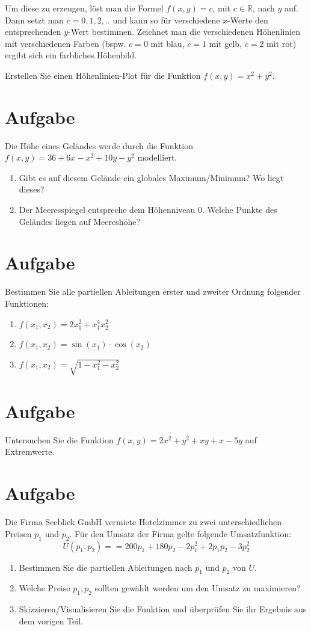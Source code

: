 \documentclass[fontsize=11pt, parskip=half]{scrartcl}
\newcommand{\R}{\mathbb{R}}
\begin{document}
Um diese zu erzeugen, löst man die Formel $f(x,y) = c$, mit $c \in \R$, nach $y$ auf. Dann setzt man $c = 0,1,2,..$ und kann so für verschiedene $x$-Werte den entsprechenden $y$-Wert bestimmen. Zeichnet man die verschiedenen Höhenlinien mit verschiedenen Farben (bspw. $c=0$ mit blau, $c=1$ mit gelb, $c= 2$ mit rot) ergibt sich ein farbliches Höhenbild.

Erstellen Sie einen Höhenlinien-Plot für die Funktion $f(x,y) = x^2 + y^2$.


\section{Aufgabe}
Die Höhe eines Geländes werde durch die Funktion $f(x,y) = 36 + 6x -x^2 + 10 y - y^2$ modelliert.
\begin{enumerate}[label=\alph*)]
    \item Gibt es auf diesem Gelände ein globales Maximum/Minimum? Wo liegt dieses?
    \item Der Meeresspiegel entspreche dem Höhenniveau $0$. Welche Punkte des Geländes liegen auf Meereshöhe?
\end{enumerate}


\section{Aufgabe}
Bestimmen Sie alle partiellen Ableitungen erster und zweiter Ordnung folgender Funktionen:
\begin{enumerate}[label=\alph*)]
    \item $f(x_1,x_2) = 2x_1^2+x_1^4x_2^2$
    \item $f(x_1,x_2) = \sin ( x_1)\cdot \cos (x_2)$
    \item $f(x_1,x_2) = \sqrt{1-x_1^2-x_2^2}$
\end{enumerate}

\section{Aufgabe}
Untersuchen Sie die Funktion $f(x,y)= 2x ^2 + y^2+xy+x-5y$ auf Extremwerte.

\section{Aufgabe}
Die Firma Seeblick GmbH vermiete Hotelzimmer zu zwei unterschiedlichen Preisen $p_1$ und $p_2$. Für den Umsatz
der Firma gelte folgende Umsatzfunktion:
\[U(p_1,p_2) = = 200p_1 +180p_2 -2p^2_1 +2p_1 p_2 -3p^2_2
    \]
\begin{enumerate}[label=\alph*)]
    \item Bestimmen Sie die partiellen Ableitungen nach $p_1$ und $p_2$ von $U$.
    \item Welche Preise $p_1,p_2$ sollten gewählt werden um den Umsatz zu maximieren?
    \item Skizzieren/Visualisieren Sie die Funktion und überprüfen Sie ihr Ergebnis aus dem vorigen Teil.
\end{enumerate}    
\end{document}
